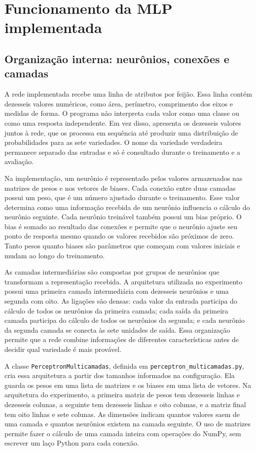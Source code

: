 \documentclass[12pt]{article}
\begin{document}
\section{Funcionamento da MLP implementada}

\subsection{Organização interna: neurônios, conexões e camadas}

A rede implementada recebe uma linha de atributos por feijão. Essa linha contém dezesseis valores numéricos, como área, perímetro, comprimento dos eixos e medidas de forma. O programa não interpreta cada valor como uma classe ou como uma resposta independente. Em vez disso, apresenta os dezesseis valores juntos à rede, que os processa em sequência até produzir uma distribuição de probabilidades para as sete variedades. O nome da variedade verdadeira permanece separado das entradas e só é consultado durante o treinamento e a avaliação.

Na implementação, um neurônio é representado pelos valores armazenados nas matrizes de pesos e nos vetores de biases. Cada conexão entre duas camadas possui um peso, que é um número ajustado durante o treinamento. Esse valor determina como uma informação recebida de um neurônio influencia o cálculo do neurônio seguinte. Cada neurônio treinável também possui um bias próprio. O bias é somado ao resultado das conexões e permite que o neurônio ajuste seu ponto de resposta mesmo quando os valores recebidos são próximos de zero. Tanto pesos quanto biases são parâmetros que começam com valores iniciais e mudam ao longo do treinamento.

As camadas intermediárias são compostas por grupos de neurônios que transformam a representação recebida. A arquitetura utilizada no experimento possui uma primeira camada intermediária com dezesseis neurônios e uma segunda com oito. As ligações são densas: cada valor da entrada participa do cálculo de todos os neurônios da primeira camada; cada saída da primeira camada participa do cálculo de todos os neurônios da segunda; e cada neurônio da segunda camada se conecta às sete unidades de saída. Essa organização permite que a rede combine informações de diferentes características antes de decidir qual variedade é mais provável.

A classe \texttt{PerceptronMulticamadas}, definida em \texttt{perceptron\_multicamadas.py}, cria essa arquitetura a partir dos tamanhos informados na configuração. Ela guarda os pesos em uma lista de matrizes e os biases em uma lista de vetores. Na arquitetura do experimento, a primeira matriz de pesos tem dezesseis linhas e dezesseis colunas, a seguinte tem dezesseis linhas e oito colunas, e a matriz final tem oito linhas e sete colunas. As dimensões indicam quantos valores saem de uma camada e quantos neurônios existem na camada seguinte. O uso de matrizes permite fazer o cálculo de uma camada inteira com operações do NumPy, sem escrever um laço Python para cada conexão.
\end{document}
